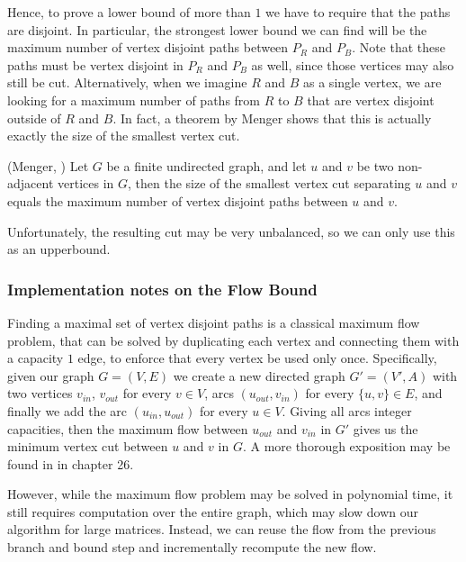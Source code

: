 	Hence, to prove a lower bound of more than $1$ we have to require that the
	paths are disjoint. In particular, the
	strongest lower bound we can find will be the maximum number of vertex
	disjoint paths between $P_R$ and $P_B$. Note that these paths must be
	vertex disjoint in $P_R$ and $P_B$ as well, since those vertices may also
	still be cut. Alternatively, when we imagine $R$ and $B$ as a single
	vertex, we are looking for a maximum number of paths from $R$ to $B$ that
	are vertex disjoint outside of $R$ and $B$. In fact, a theorem by Menger
	shows that this is actually exactly the size of the smallest vertex cut.

	\begin{theorem}{(Menger, \cite{menger1927allgemeinen})}
		Let $G$ be a finite undirected graph, and let $u$ and $v$ be two
		non-adjacent vertices in $G$, then the size of the smallest vertex cut
		separating $u$ and $v$ equals the maximum number of vertex disjoint
		paths between $u$ and $v$.
	\end{theorem}

	Unfortunately, the resulting cut may be very unbalanced, so we can only
	use this as an upperbound.

	\subsubsection{Implementation notes on the Flow Bound}

	Finding a maximal set of vertex disjoint paths is a classical maximum flow
	problem, that can be solved by duplicating each vertex and connecting them
	with a capacity $1$ edge, to enforce that every vertex be used only once.
	Specifically, given our graph $G = (V, E)$ we create
	a new directed graph $G' = (V', A)$ with two vertices $v_{in}$, $v_{out}$
	for every $v \in V$, arcs $(u_{out}, v_{in})$ for every $\{u, v\} \in E$,
	and finally we add the arc $(u_{in}, u_{out})$ for every $u \in V$.
	Giving all arcs integer capacities, then the maximum flow between
	$u_{out}$ and $v_{in}$ in $G'$ gives us the minimum vertex cut between
	$u$ and $v$ in $G$.
	A more thorough exposition may be found in \cite{thomas2001introduction}
	in chapter 26.

	However, while the maximum flow problem may be solved in polynomial time,
	it still requires computation over the entire graph, which may slow down
	our algorithm for large matrices. Instead, we can reuse the flow from the
	previous branch and bound step and incrementally recompute the new flow.

